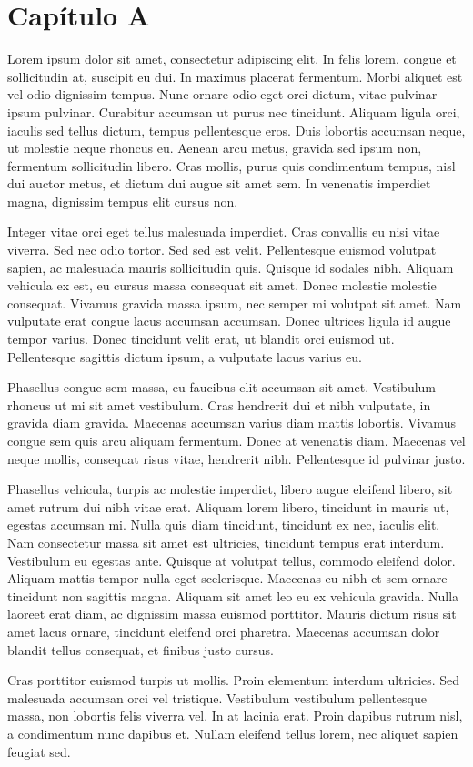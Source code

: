 \chapter{Cap\'itulo A}
\label{chap:A}

Lorem ipsum dolor sit amet, consectetur adipiscing elit. In felis lorem, congue et sollicitudin at, suscipit eu dui. In maximus placerat fermentum. Morbi aliquet est vel odio dignissim tempus. Nunc ornare odio eget orci dictum, vitae pulvinar ipsum pulvinar. Curabitur accumsan ut purus nec tincidunt. Aliquam ligula orci, iaculis sed tellus dictum, tempus pellentesque eros. Duis lobortis accumsan neque, ut molestie neque rhoncus eu. Aenean arcu metus, gravida sed ipsum non, fermentum sollicitudin libero. Cras mollis, purus quis condimentum tempus, nisl dui auctor metus, et dictum dui augue sit amet sem. In venenatis imperdiet magna, dignissim tempus elit cursus non.

Integer vitae orci eget tellus malesuada imperdiet. Cras convallis eu nisi vitae viverra. Sed nec odio tortor. Sed sed est velit. Pellentesque euismod volutpat sapien, ac malesuada mauris sollicitudin quis. Quisque id sodales nibh. Aliquam vehicula ex est, eu cursus massa consequat sit amet. Donec molestie molestie consequat. Vivamus gravida massa ipsum, nec semper mi volutpat sit amet. Nam vulputate erat congue lacus accumsan accumsan. Donec ultrices ligula id augue tempor varius. Donec tincidunt velit erat, ut blandit orci euismod ut. Pellentesque sagittis dictum ipsum, a vulputate lacus varius eu.

Phasellus congue sem massa, eu faucibus elit accumsan sit amet. Vestibulum rhoncus ut mi sit amet vestibulum. Cras hendrerit dui et nibh vulputate, in gravida diam gravida. Maecenas accumsan varius diam mattis lobortis. Vivamus congue sem quis arcu aliquam fermentum. Donec at venenatis diam. Maecenas vel neque mollis, consequat risus vitae, hendrerit nibh. Pellentesque id pulvinar justo.

Phasellus vehicula, turpis ac molestie imperdiet, libero augue eleifend libero, sit amet rutrum dui nibh vitae erat. Aliquam lorem libero, tincidunt in mauris ut, egestas accumsan mi. Nulla quis diam tincidunt, tincidunt ex nec, iaculis elit. Nam consectetur massa sit amet est ultricies, tincidunt tempus erat interdum. Vestibulum eu egestas ante. Quisque at volutpat tellus, commodo eleifend dolor. Aliquam mattis tempor nulla eget scelerisque. Maecenas eu nibh et sem ornare tincidunt non sagittis magna. Aliquam sit amet leo eu ex vehicula gravida. Nulla laoreet erat diam, ac dignissim massa euismod porttitor. Mauris dictum risus sit amet lacus ornare, tincidunt eleifend orci pharetra. Maecenas accumsan dolor blandit tellus consequat, et finibus justo cursus.

Cras porttitor euismod turpis ut mollis. Proin elementum interdum ultricies. Sed malesuada accumsan orci vel tristique. Vestibulum vestibulum pellentesque massa, non lobortis felis viverra vel. In at lacinia erat. Proin dapibus rutrum nisl, a condimentum nunc dapibus et. Nullam eleifend tellus lorem, nec aliquet sapien feugiat sed.


